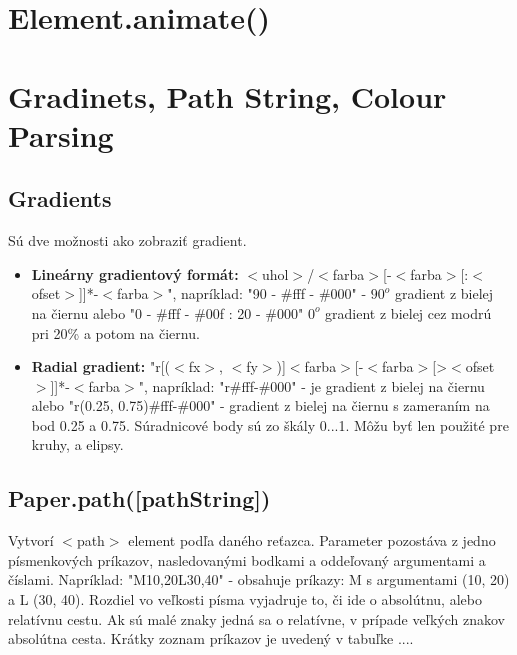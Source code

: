 \section{Element.animate()}




\section{Gradinets, Path String, Colour Parsing}
\subsection{Gradients}
Sú dve možnosti ako zobraziť gradient.
\begin{itemize}
	\item \textbf{Lineárny gradientový formát: } $<$uhol$>$/$<$farba$>$[-$<$farba$>$[:$<$ofset$>$]]*-$<$farba$>$", napríklad: "90 - \#fff - \#000" - $90^o$ gradient z bielej na čiernu
	alebo "0 - \#fff - \#00f : 20 - \#000" $0^o$ gradient z bielej cez modrú pri  20\% a potom na čiernu. 
	\item \textbf{Radial gradient: }"r[($<$fx$>$, $<$fy$>$)]$<$farba$>$[-$<$farba$>$[>$<$ofset$>$]]*-$<$farba$>$", napríklad: "r\#fff-\#000" - je gradient z bielej na čiernu alebo "r(0.25, 0.75)\#fff-\#000" - gradient z bielej na čiernu s zameraním na bod 0.25 a 0.75. Súradnicové body sú zo škály 0...1. Môžu byť len použité pre kruhy, a elipsy.
\end{itemize}

\subsection{Paper.path([pathString])}
Vytvorí $<$path$>$ element podľa daného reťazca. Parameter pozostáva z jedno písmenkových príkazov, nasledovanými bodkami a oddeľovaný argumentami a číslami. 
Napríklad: "M10,20L30,40" - obsahuje príkazy: M s argumentami (10, 20) a L (30, 40). Rozdiel vo veľkosti písma vyjadruje to, či ide o absolútnu, alebo relatívnu cestu. Ak sú malé znaky jedná sa o relatívne, v prípade veľkých znakov absolútna cesta. 
Krátky zoznam príkazov je uvedený v tabuľke ....

